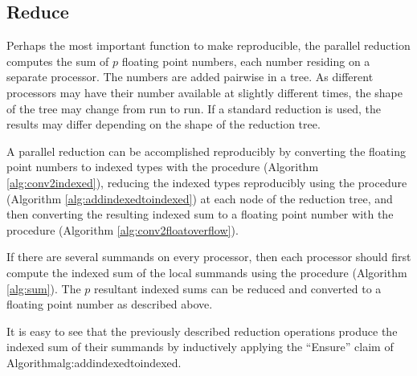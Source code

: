 \subsection{Reduce}
  \label{sec:compositeops_reduce}
  Perhaps the most important function to make reproducible, the parallel reduction computes the sum of $p$ floating point numbers, each number residing on a separate processor. The numbers are added pairwise in a tree. As different processors may have their number available at slightly different times, the shape of the tree may change from run to run. If a standard reduction is used, the results may differ depending on the shape of the reduction tree.

  A parallel reduction can be accomplished reproducibly by converting the floating point numbers to indexed types with the  procedure (Algorithm \ref{alg:conv2indexed}), reducing the indexed types reproducibly using the  procedure (Algorithm \ref{alg:addindexedtoindexed}) at each node of the reduction tree, and then converting the resulting indexed sum to a floating point number with the  procedure (Algorithm \ref{alg:conv2floatoverflow}). 

  If there are several summands on every processor, then each processor should first compute the indexed sum of the local summands using the  procedure (Algorithm \ref{alg:sum}). The $p$ resultant indexed sums can be reduced and converted to a floating point number as described above.

  It is easy to see that the previously described reduction operations produce the indexed sum of their summands by inductively applying the ``Ensure'' claim of Algorithm{alg:addindexedtoindexed}.
